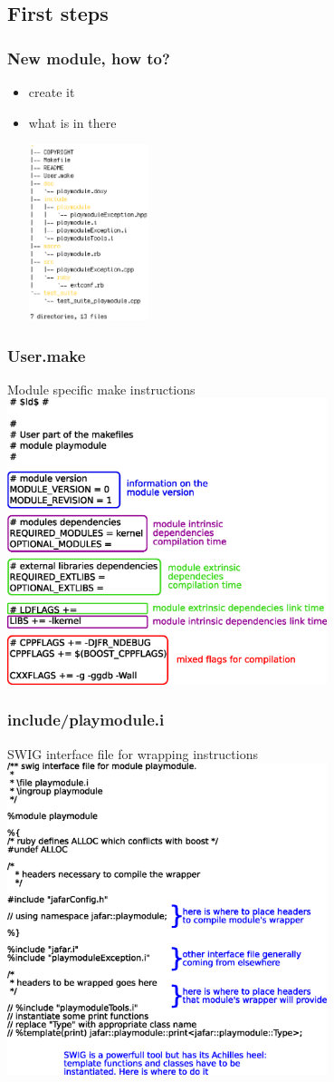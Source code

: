 \documentclass[pdf]{beamer}
\begin{document}
\subsection{First steps}
\begin{frame}
\frametitle{New module, how to?}
 \begin{itemize}
   \item<1-> create it
     
   \item<2-> what is in there
     
     \includegraphics[width=0.275\textwidth]{tree_result.eps}
   \end{itemize}
\end{frame}
\begin{frame}
  \frametitle{User.make}
  Module specific make instructions
  \includegraphics[width=0.7\textwidth]{user_make.eps}
\end{frame}
\begin{frame}
  \frametitle{include/playmodule.i}
  SWIG interface file for wrapping instructions
  \includegraphics[width=0.7\textwidth]{swig.eps}
\end{frame}
\end{document}
